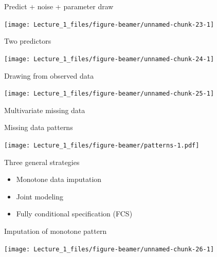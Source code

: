 \documentclass[ignorenonframetext,aspectratio=43]{beamer}
\providecommand{\tightlist}{%
  \setlength{\itemsep}{0pt}\setlength{\parskip}{0pt}}
\begin{document}
\begin{frame}{Predict + noise + parameter draw}
\protect\hypertarget{predict-noise-parameter-draw}{}

\texttt{[image: Lecture\_1\_files/figure-beamer/unnamed-chunk-23-1]}

\end{frame}

\begin{frame}{Two predictors}
\protect\hypertarget{two-predictors}{}

\texttt{[image: Lecture\_1\_files/figure-beamer/unnamed-chunk-24-1]}

\end{frame}

\begin{frame}{Drawing from observed data}
\protect\hypertarget{drawing-from-observed-data}{}

\texttt{[image: Lecture\_1\_files/figure-beamer/unnamed-chunk-25-1]}

\end{frame}

\begin{frame}{Multivariate missing data}
\protect\hypertarget{multivariate-missing-data}{}

\end{frame}

\begin{frame}{Missing data patterns}
\protect\hypertarget{missing-data-patterns}{}

\texttt{[image: Lecture\_1\_files/figure-beamer/patterns-1.pdf]}

\end{frame}

\begin{frame}{Three general strategies}
\protect\hypertarget{three-general-strategies}{}

\begin{itemize}
\tightlist
\item
  Monotone data imputation
\item
  Joint modeling
\item
  Fully conditional specification (FCS)
\end{itemize}

\end{frame}

\begin{frame}{Imputation of monotone pattern}
\protect\hypertarget{imputation-of-monotone-pattern}{}

\begin{center}\texttt{[image: Lecture\_1\_files/figure-beamer/unnamed-chunk-26-1]} \end{center}

\end{frame}
\end{document}
